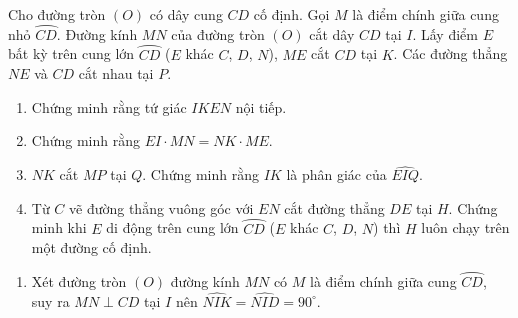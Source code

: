 \begin{ex}%
 Cho đường tròn $(O)$ có dây cung $CD$ cố định. Gọi $M$ là điểm chính giữa cung nhỏ $\wideparen{CD}$. Đường kính $MN$ của đường tròn $(O)$ cắt dây $CD$ tại $I$. Lấy điểm $E$ bất kỳ trên cung lớn $\wideparen{CD}$ ($E$ khác $C$, $D$, $N$), $ME$ cắt $CD$ tại $K$. Các đường thẳng $NE$ và $CD$ cắt nhau tại $P$.
 \begin{enumerate}
  \item Chứng minh rằng tứ giác $IKEN$ nội tiếp.
  \item Chứng minh rằng $EI \cdot MN = NK \cdot ME$.
  \item $NK$ cắt $MP$ tại $Q$. Chứng minh rằng $IK$ là phân giác của $\widehat{EIQ}$.
  \item Từ $C$ vẽ đường thẳng vuông góc với $EN$ cắt đường thẳng $DE$ tại $H$. Chứng minh khi $E$ di động trên cung lớn $\wideparen{CD}$ ($E$ khác $C$, $D$, $N$) thì $H$ luôn chạy trên một đường cố định.
 \end{enumerate}
 \loigiai
  {
  \begin{center}
  \end{center}
  \begin{enumerate}
   \item Xét đường tròn $(O)$ đường kính $MN$ có $M$ là điểm chính giữa cung $\wideparen{CD}$, suy ra $MN \perp CD$ tại $I$ nên $\widehat{NIK}=\widehat{NID}=90^\circ$.\\

\end{enumerate}}
\end{ex}
